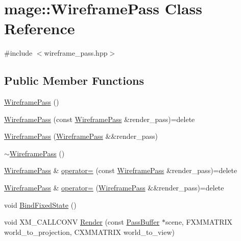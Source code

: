 \hypertarget{classmage_1_1_wireframe_pass}{}\section{mage\+:\+:Wireframe\+Pass Class Reference}
\label{classmage_1_1_wireframe_pass}


{\ttfamily \#include $<$wireframe\+\_\+pass.\+hpp$>$}

\subsection*{Public Member Functions}
\begin{DoxyCompactItemize}
\item 
\hyperlink{classmage_1_1_wireframe_pass_a7323b3caca5d06a068a89c0333651f04}{Wireframe\+Pass} ()
\item 
\hyperlink{classmage_1_1_wireframe_pass_a3e070108925c2ef3b4feaa29dbf605f2}{Wireframe\+Pass} (const \hyperlink{classmage_1_1_wireframe_pass}{Wireframe\+Pass} \&render\+\_\+pass)=delete
\item 
\hyperlink{classmage_1_1_wireframe_pass_a08631bc9b341bed85b1b14b99affb1f0}{Wireframe\+Pass} (\hyperlink{classmage_1_1_wireframe_pass}{Wireframe\+Pass} \&\&render\+\_\+pass)
\item 
\hyperlink{classmage_1_1_wireframe_pass_a186e4dd37ac17382872180385ec4dca1}{$\sim$\+Wireframe\+Pass} ()
\item 
\hyperlink{classmage_1_1_wireframe_pass}{Wireframe\+Pass} \& \hyperlink{classmage_1_1_wireframe_pass_a57da0b468c68c8653ebc639923b111ba}{operator=} (const \hyperlink{classmage_1_1_wireframe_pass}{Wireframe\+Pass} \&render\+\_\+pass)=delete
\item 
\hyperlink{classmage_1_1_wireframe_pass}{Wireframe\+Pass} \& \hyperlink{classmage_1_1_wireframe_pass_abd90640d63b9ce0c44b87de87d06910c}{operator=} (\hyperlink{classmage_1_1_wireframe_pass}{Wireframe\+Pass} \&\&render\+\_\+pass)=delete
\item 
void \hyperlink{classmage_1_1_wireframe_pass_abf99690ae099ed0ba0ca35c5d87ac0ef}{Bind\+Fixed\+State} ()
\item 
void X\+M\+\_\+\+C\+A\+L\+L\+C\+O\+NV \hyperlink{classmage_1_1_wireframe_pass_ac0810f125c8539cb6b27bdbfc6535d2e}{Render} (const \hyperlink{structmage_1_1_pass_buffer}{Pass\+Buffer} $\ast$scene, F\+X\+M\+M\+A\+T\+R\+IX world\+\_\+to\+\_\+projection, C\+X\+M\+M\+A\+T\+R\+IX world\+\_\+to\+\_\+view)
\end{DoxyCompactItemize}
